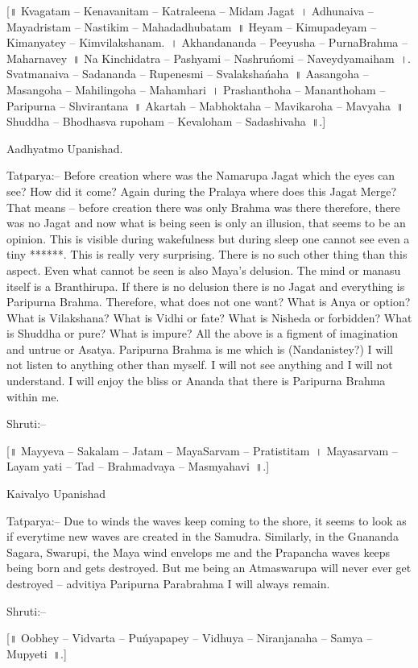 [॥ Kvagatam – Kenavanitam – Katraleena – Midam Jagat~। Adhunaiva – Mayadristam – Nastikim – Mahadadhubatam~॥ Heyam – Kimupadeyam – Kimanyatey – Kimvilakshanam.~। Akhandananda – Peeyusha – PurnaBrahma – Maharnavey~॥ Na Kinchidatra – Pashyami – Nashruńomi – Naveydyamaiham~।. Svatmanaiva – Sadananda – Rupenesmi – Svalakshańaha~॥ Aasangoha – Masangoha – Mahilingoha – Mahamhari~। Prashanthoha – Mananthoham – Paripurna – Shvirantana~॥ Akartah – Mabhoktaha – Mavikaroha – Mavyaha~॥ Shuddha – Bhodhasva rupoham – Kevaloham – Sadashivaha~॥.]

Aadhyatmo Upanishad.

Tatparya:– Before creation where was the Namarupa Jagat which the eyes can see? How did it come? Again during the Pralaya where does this Jagat Merge? That means – before creation there was only Brahma was there therefore, there was no Jagat and now what is being seen is only an illusion, that seems to be an opinion. This is visible during wakefulness but during sleep one cannot see even a tiny ******. This is really very surprising. There is no such other thing than this aspect. Even what cannot be seen is also Maya's delusion. The mind or manasu itself is a Branthirupa. If there is no delusion there is no Jagat and everything is Paripurna Brahma. Therefore, what does not one want? What is Anya or option? What is Vilakshana? What is Vidhi or fate? What is Nisheda or forbidden? What is Shuddha or pure? What is impure? All the above is a figment of imagination and untrue or Asatya. Paripurna Brahma is me which is (Nandanistey?) I will not listen to anything other than myself. I will not see anything and I will not understand. I will enjoy the bliss or Ananda that there is Paripurna Brahma within me.

Shruti:–

[॥ Mayyeva – Sakalam – Jatam – MayaSarvam – Pratistitam~। Mayasarvam – Layam yati – Tad – Brahmadvaya – Masmyahavi~॥.]

Kaivalyo Upanishad

Tatparya:– Due to winds the waves keep coming to the shore, it seems to look as if everytime new waves are created in the Samudra. Similarly, in the Gnananda Sagara, Swarupi, the Maya wind envelops me and the Prapancha waves keeps being born and gets destroyed. But me being an Atmaswarupa will never ever get destroyed – advitiya Paripurna Parabrahma I will always remain.

Shruti:–

[॥ Oobhey – Vidvarta – Puńyapapey – Vidhuya – Niranjanaha – Samya – Mupyeti~॥.]

